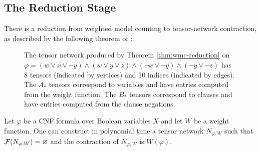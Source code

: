 \subsection{The Reduction Stage}
\label{sec:algorithm:reduction}
There is a reduction from weighted model counting to tensor-network contraction, as described by the following theorem of \cite{DDV19}:
\begin{figure}[t]
	\centering
	
	\caption{\label{fig:wmc-example} The tensor network produced by Theorem \ref{thm:wmc-reduction} on $\varphi = (w \lor x \lor \neg y) \land (w \lor y \lor z) \land (\neg x \lor \neg y) \land (\neg y \lor \neg z)$ has 8 tensors (indicated by vertices) and 10 indices (indicated by edges). The $A_*$ tensors correspond to variables and have entries computed from the weight function.  The $B_*$ tensors correspond to clauses and have entries computed from the clause negations.}
\end{figure}
\begin{theorem}
\label{thm:wmc-reduction}
Let $\varphi$ be a CNF formula over Boolean variables $X$ and let $W$ be a weight function. One can construct in polynomial time a tensor network $N_{\varphi,W}$ such that $\mathcal{F}(N_{\varphi,W}) = \varnothing$ and the contraction of $N_{\varphi,W}$ is $W(\varphi)$.
\end{theorem}
